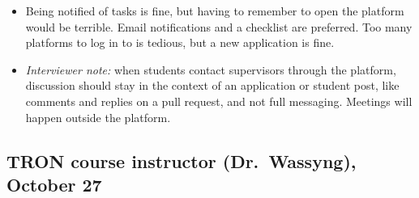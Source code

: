 \documentclass{article}
\begin{document}
\begin{itemize}
        sides agreed before the process goes to instructor approval.
        \item Being notified of tasks is fine, but having to remember to open the platform would be terrible.
        Email notifications and a checklist are preferred. Too many platforms to log in to is tedious, but a
        new application is fine.
        \item \emph{Interviewer note:} when students contact supervisors through the platform, discussion should
        stay in the context of an application or student post, like comments and replies on a pull request, and
        not full messaging. Meetings will happen outside the platform.
    \end{itemize}

    \subsection{TRON course instructor (Dr.~Wassyng), October 27}
    \label{int:TI-1}
\end{document}
